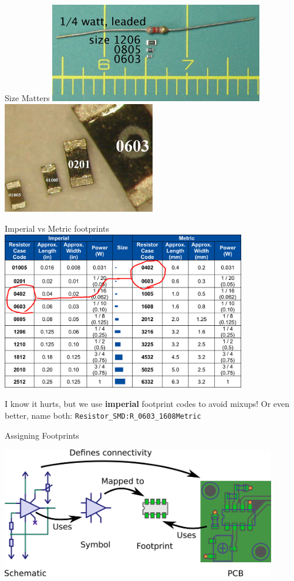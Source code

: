 \documentclass{beamer}
\begin{document}
\begin{frame}{Size Matters}
  \centering
  \includegraphics[width=0.7\textwidth]{images/size-matters1.png}
  \includegraphics[width=0.5\textwidth]{images/size-matters2.png}
\end{frame}

\begin{frame}{Imperial vs Metric footprints}
  \centering
  \includegraphics[width=0.8\textwidth]{images/imperial-metric-mixup.png}

  I know it hurts, but we use \textbf{imperial} footprint codes to avoid mixups!
  Or even better, name both: \texttt{Resistor\_SMD:R\_0603\_1608Metric}
\end{frame}

\begin{frame}{Assigning Footprints}
  \begin{center}
    \includegraphics[width=0.9\textwidth]{images/symbol-to-footprint.png}
  \end{center}
\end{frame}
\end{document}
